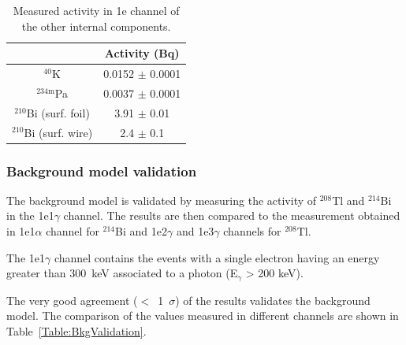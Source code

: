 \documentclass[main.tex]{subfiles}
\begin{document}
\begin{table}
\centering
\begin{tabular}{c|c}
 & Activity (Bq) \\
\midrule
$^{\text{40}}$K                 & 0.0152 $\pm$ 0.0001 \\ [0.05cm]
$^{\text{234m}}$Pa              & 0.0037 $\pm$ 0.0001 \\ [0.05cm]
$^{\text{210}}$Bi (surf. foil)  & 3.91   $\pm$ 0.01   \\ [0.05cm]
$^{\text{210}}$Bi (surf. wire)  & 2.4    $\pm$ 0.1    \\ [0.05cm]
\bottomrule
\end{tabular}
\caption{Measured activity in 1e channel of the other internal components. }
\label{Table1e-activityMeasurement}
\end{table}



\FloatBarrier




\subsubsection{Background model validation}


\NI The background model is validated by measuring the activity of $^{\text{208}}$Tl and $^{\text{214}}$Bi in the 1e1$\gamma$ channel. The results are then compared to the measurement obtained in 1e1$\alpha$ channel for $^{\text{214}}$Bi and 1e2$\gamma$ and  1e3$\gamma$ channels for $^{\text{208}}$Tl.


\bigskip


\NI The 1e1$\gamma$ channel contains the events with a single electron having an energy greater than 300~keV associated to a photon (E$_{\gamma}$ > 200 keV). 


\bigskip


\NI The very good agreement ($<$~1~$\sigma$) of the results validates the background model. The comparison of the values measured in different channels are shown in Table~\ref{Table:BkgValidation}.
\end{document}
